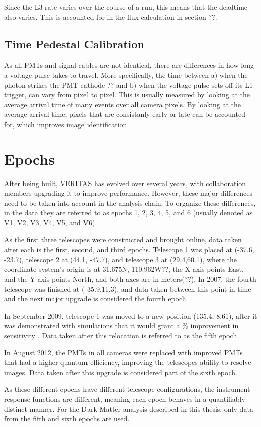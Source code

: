 Since the L3 rate varies over the course of a run, this means that the deadtime also varies.
This is accounted for in the flux calculation in section ??.

\subsection{Time Pedestal Calibration}
As all PMTs and signal cables are not identical, there are differences in how long a voltage pulse takes to travel.
More specifically, the time between a) when the photon strikes the PMT cathode ?? and b) when the voltage pulse sets off its L1 trigger, can vary from pixel to pixel.
This is usually measured by looking at the average arrival time of many events over all camera pixels.
By looking at the average arrival time, pixels that are consistanly early or late can be accounted for, which improves image identification.

\section{Epochs}\label{sec:epochs}
After being built, VERITAS has evolved over several years, with collaboration members upgrading it to improve performance.
However, these major differences need to be taken into account in the analysis chain.
To organize these differences, in the data they are referred to as epochs 1, 2, 3, 4, 5, and 6 (usually denoted as V1, V2, V3, V4, V5, and V6).

As the first three telescopes were constructed and brought online, data taken after each is the first, second, and third epochs.
Telescope 1 was placed at (-37.6, -23.7), telescope 2 at (44.1, -47.7), and telescope 3 at (29.4,60.1), where the coordinate system's origin is at 31.675N, 110.962W??, the X axis points East, and the Y axis points North, and both axes are in meters(??).
In 2007, the fourth telescope was finished at (-35.9,11.3), and data taken between this point in time and the next major upgrade is considered the fourth epoch.

In September 2009, telescope 1 was moved to a new position (135.4,-8.61), after it was demonstrated with simulations that it would grant a \% improvement in sensitivity \cite{veritas_t1_move}.
Data taken after this relocation is referred to as the fifth epoch.

In August 2012, the PMTs in all cameras were replaced with improved PMTs that had a higher quantum efficiency, improving the telescopes ability to resolve images\cite{pmtmodels}.
Data taken after this upgrade is considered part of the sixth epoch.

As these different epochs have different telescope configurations, the instrument response functions are different, meaning each epoch behaves in a quantifiably distinct manner.
For the Dark Matter analysis described in this thesis, only data from the fifth and sixth epochs are used.


